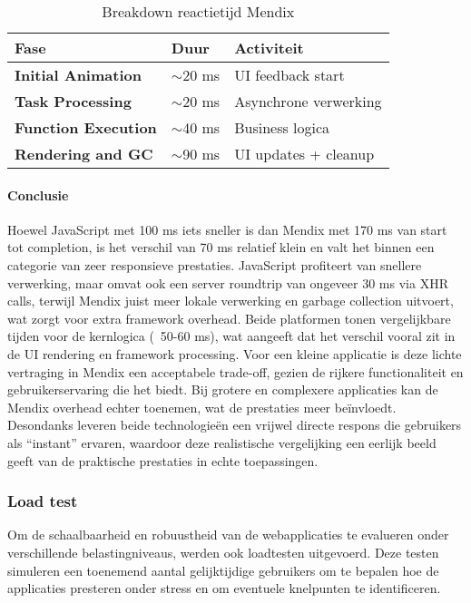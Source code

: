 \begin{table}[H]
    \centering
    \begin{tabular}{ |p{5cm}|p{3cm}|p{6cm}|}
        \hline
        \textbf{Fase} & \textbf{Duur} & \textbf{Activiteit}\\
        \hline
        \textbf{Initial Animation}  & $\sim$20 ms & \gls{UI} feedback start \\
        \hline
        \textbf{Task Processing} & $\sim$20 ms & Asynchrone verwerking \\
        \hline
        \textbf{Function Execution}  & $\sim$40 ms & Business logica \\
        \hline
        \textbf{Rendering and \gls{GC}}  & $\sim$90 ms & \gls{UI} updates + cleanup \\
        \hline                       
        
    \end{tabular}
    \caption[\centering Breakdown reactietijd Mendix]{\label{tab:breakdown Mendix reactietijd}Breakdown reactietijd Mendix}
\end{table}


\pagebreak
\newpage


\paragraph{Conclusie}
Hoewel JavaScript met 100 ms iets sneller is dan Mendix met 170 ms van start tot completion, is het verschil van 70 ms relatief klein en valt het binnen een categorie van zeer responsieve prestaties. JavaScript profiteert van snellere verwerking, maar omvat ook een server roundtrip van ongeveer 30 ms via \gls{XHR} calls, terwijl Mendix juist meer lokale verwerking en garbage collection uitvoert, wat zorgt voor extra framework overhead. Beide platformen tonen vergelijkbare tijden voor de kernlogica (~50-60 ms), wat aangeeft dat het verschil vooral zit in de UI rendering en framework processing. Voor een kleine applicatie is deze lichte vertraging in Mendix een acceptabele trade-off, gezien de rijkere functionaliteit en gebruikerservaring die het biedt. Bij grotere en complexere applicaties kan de Mendix overhead echter toenemen, wat de prestaties meer beïnvloedt. Desondanks leveren beide technologieën een vrijwel directe respons die gebruikers als “instant” ervaren, waardoor deze realistische vergelijking een eerlijk beeld geeft van de praktische prestaties in echte toepassingen.



\subsubsection{Load test}
Om de schaalbaarheid en robuustheid van de webapplicaties te evalueren onder verschillende belastingniveaus, werden ook loadtesten uitgevoerd. Deze testen simuleren een toenemend aantal gelijktijdige gebruikers om te bepalen hoe de applicaties presteren onder stress en om eventuele knelpunten te identificeren.


